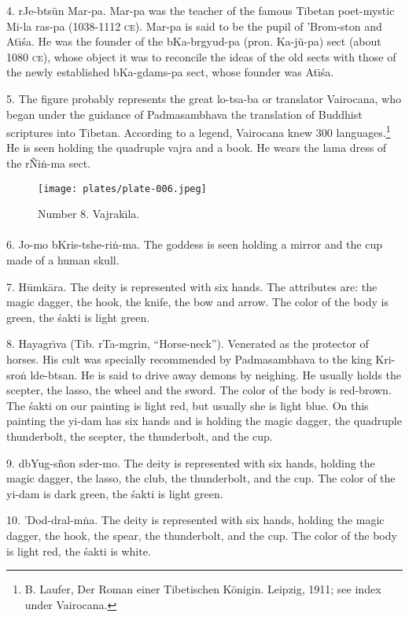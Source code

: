 \documentclass[a4paper, 12pt, oneside]{article}
\begin{document}
4. rJe-btsün Mar-pa. Mar-pa was the teacher of the famous Tibetan poet-mystic Mi-la ras-pa (1038-1112 \textsc{ce}). Mar-pa is said to be the pupil of 'Brom-ston and At\={\i}\'{s}a. He was the founder of the bKa-brgyud-pa (pron. Ka-jü-pa) sect (about 1080 \textsc{ce}), whose object it was to reconcile the ideas of the old sects with those of the newly established bKa-gdams-pa sect, whose founder was At\={\i}\'{s}a.

5. The figure probably represents the great lo-tsa-ba or translator Vairocana, who began under the guidance of Padmasambhava the translation of Buddhist scriptures into Tibetan. According to a legend, Vairocana knew 300 languages.\footnote{B. Laufer, Der Roman einer Tibetischen Königin. Leipzig, 1911; see index under Vairocana.} He is seen holding the quadruple vajra and a book. He wears the lama dress of the rÑi\.{n}-ma sect.
\clearpage
\begin{figure}[H]
\centering
\texttt{[image: plates/plate-006.jpeg]}
\caption*{Number 8. Vajrak\={\i}la.}
\end{figure}
\clearpage
\paragraph{}
6. Jo-mo bKris-tshe-ri\.{n}-ma. The goddess is seen holding a mirror and the cup made of a human skull.

7. H\={u}mk\={a}ra. The deity is represented with six hands. The attributes are: the magic dagger, the hook, the knife, the bow and arrow. The color of the body is green, the \'{s}akti is light green.

8. Hayagr\={\i}va (Tib. rTa-mgrin, ``Horse-neck''). Venerated as the protector of horses. His cult was specially recommended by Padmasambhava to the king Kri-sro\.{n} lde-btsan. He is said to drive away demons by neighing. He usually holds the scepter, the lasso, the wheel and the sword. The color of the body is red-brown. The \'{s}akti on our painting is light red, but usually she is light blue. On this painting the yi-dam has six hands and is holding the magic dagger, the quadruple thunderbolt, the scepter, the thunderbolt, and the cup.

9. dbYug-s\~{n}on sder-mo. The deity is represented with six hands, holding the magic dagger, the lasso, the club, the thunderbolt, and the cup. The color of the yi-dam is dark green, the \'{s}akti is light green.

10. 'Dod-dral-m\.{n}a. The deity is represented with six hands, holding the magic dagger, the hook, the spear, the thunderbolt, and the cup. The color of the body is light red, the \'{s}akti is white.
\end{document}
